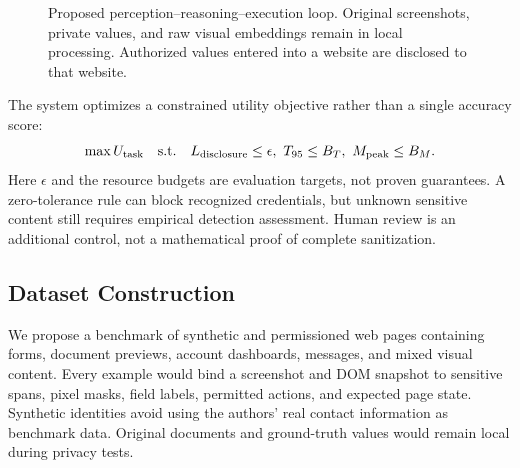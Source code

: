 \documentclass[conference]{IEEEtran}
\begin{document}
\begin{figure}[t]
\centering
{}
\caption{Proposed perception--reasoning--execution loop. Original screenshots, private values, and raw visual embeddings remain in local processing. Authorized values entered into a website are disclosed to that website.}
\label{fig:architecture}
\end{figure}

The system optimizes a constrained utility objective rather than a single accuracy score:
\begin{equation}
 \max U_{\rm task}\quad\text{s.t.}\quad
 L_{\rm disclosure}\leq\epsilon,\ T_{95}\leq B_T,\ M_{\rm peak}\leq B_M.
\end{equation}
Here $\epsilon$ and the resource budgets are evaluation targets, not proven guarantees. A zero-tolerance rule can block recognized credentials, but unknown sensitive content still requires empirical detection assessment. Human review is an additional control, not a mathematical proof of complete sanitization.

\subsection{Dataset Construction}
We propose a benchmark of synthetic and permissioned web pages containing forms, document previews, account dashboards, messages, and mixed visual content. Every example would bind a screenshot and DOM snapshot to sensitive spans, pixel masks, field labels, permitted actions, and expected page state. Synthetic identities avoid using the authors' real contact information as benchmark data. Original documents and ground-truth values would remain local during privacy tests.
\end{document}
